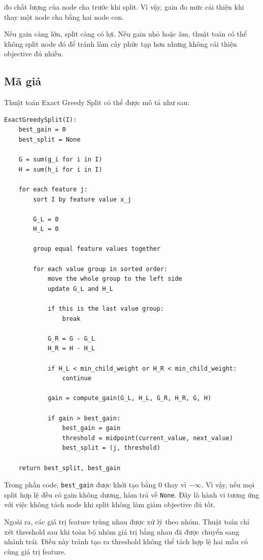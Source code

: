 đo chất lượng của node cha trước khi split. Vì vậy, gain đo mức cải thiện khi thay một node cha bằng hai node con.

Nếu gain càng lớn, split càng có lợi. Nếu gain nhỏ hoặc âm, thuật toán có thể không split node đó để tránh làm cây phức tạp hơn nhưng không cải thiện objective đủ nhiều.

\subsection{Mã giả}

Thuật toán Exact Greedy Split có thể được mô tả như sau:

\begin{lstlisting}[style=pseudocode, caption={Exact Greedy Split}, label={lst:exact_greedy_split}]
ExactGreedySplit(I):
    best_gain = 0
    best_split = None

    G = sum(g_i for i in I)
    H = sum(h_i for i in I)

    for each feature j:
        sort I by feature value x_j

        G_L = 0
        H_L = 0

        group equal feature values together

        for each value group in sorted order:
            move the whole group to the left side
            update G_L and H_L

            if this is the last value group:
                break

            G_R = G - G_L
            H_R = H - H_L

            if H_L < min_child_weight or H_R < min_child_weight:
                continue

            gain = compute_gain(G_L, H_L, G_R, H_R, G, H)

            if gain > best_gain:
                best_gain = gain
                threshold = midpoint(current_value, next_value)
                best_split = (j, threshold)

    return best_split, best_gain
\end{lstlisting}

Trong phần code, \texttt{best\_gain} được khởi tạo bằng $0$ thay vì $-\infty$. Vì vậy, nếu mọi split hợp lệ đều có gain không dương, hàm trả về \texttt{None}. Đây là hành vi tương ứng với việc không tách node khi split không làm giảm objective đủ tốt.

Ngoài ra, các giá trị feature trùng nhau được xử lý theo nhóm. Thuật toán chỉ xét threshold sau khi toàn bộ nhóm giá trị bằng nhau đã được chuyển sang nhánh trái. Điều này tránh tạo ra threshold không thể tách hợp lệ hai mẫu có cùng giá trị feature.

